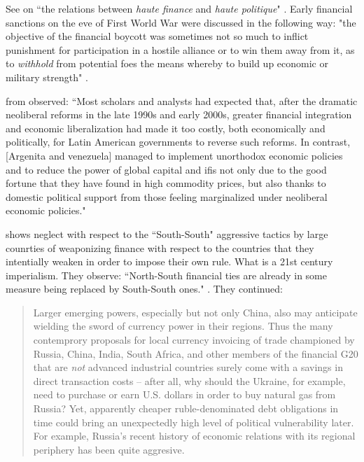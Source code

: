 See \cite{viner1929} on ``the relations between \textit{haute finance}
 and \textit{haute politique}" \citep[p.~408, emphasis original]{viner1929}. Early financial sanctions on the eve of First World War were discussed in the following way: "the objective of the financial boycott was sometimes
 not so much to inflict punishment for participation in a hostile
 alliance or to win them away from it, as to \textit{withhold} from
 potential foes the means whereby to build up economic or
 military strength" \citep[p.~448, emphasis added]{viner1929}.
 
\cite[pp.~21-22]{labaqui2014} from \cite{armijo2014} observed: ``Most scholars and analysts had expected that, after the dramatic neoliberal reforms in the late 1990s and early 2000s, greater financial integration and economic liberalization had made it too costly, both economically and politically, for Latin American governments to reverse such reforms. In contrast, [Argenita and venezuela] managed to implement unorthodox economic policies and to reduce the power of global capital and \acp{ifi} not only due to the good fortune that they have found in high commodity prices, but also thanks to domestic political support from those feeling marginalized under neoliberal economic policies."

\citeauthor{katada2014} shows neglect with respect to the ``South-South" aggressive tactics by large counrties of weaponizing finance with respect to the countries that they intentially weaken in order to impose their own rule. What is a 21st century imperialism. They observe: ``North-South financial ties are already in some measure being replaced by South-South ones." \citep[p.~11]{katada2014}. They continued:

\begin{quote}
Larger emerging powers, especially but not only China, also may anticipate wielding the sword of currency power in their regions. Thus the many contemprory proposals for local currency invoicing of trade championed by Russia, China, India, South Africa, and other members of the financial G20 that are \textit{not} advanced industrial countries surely come with a savings in direct transaction costs -- after all, why should the Ukraine, for example, need to purchase or earn U.S. dollars in order to buy natural gas from Russia? Yet, apparently cheaper ruble-denominated debt obligations in time could bring an unexpectedly high level of political vulnerability later. For example, Russia's recent history of economic relations with its regional periphery has been quite aggresive. \citep[p.~12, emphasis original]{katada2014}
\end{quote}

